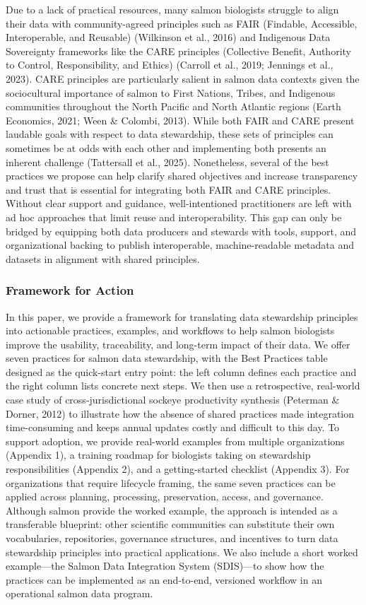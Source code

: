 \documentclass[
  letterpaper,
  DIV=11,
  numbers=noendperiod]{scrartcl}
\begin{document}
Due to a lack of practical resources, many salmon biologists struggle to
align their data with community-agreed principles such as FAIR
(Findable, Accessible, Interoperable, and Reusable) (Wilkinson et al.,
2016) and Indigenous Data Sovereignty frameworks like the CARE
principles (Collective Benefit, Authority to Control, Responsibility,
and Ethics) (Carroll et al., 2019; Jennings et al., 2023). CARE
principles are particularly salient in salmon data contexts given the
sociocultural importance of salmon to First Nations, Tribes, and
Indigenous communities throughout the North Pacific and North Atlantic
regions (Earth Economics, 2021; Ween \& Colombi, 2013). While both FAIR
and CARE present laudable goals with respect to data stewardship, these
sets of principles can sometimes be at odds with each other and
implementing both presents an inherent challenge (Tattersall et al.,
2025). Nonetheless, several of the best practices we propose can help
clarify shared objectives and increase transparency and trust that is
essential for integrating both FAIR and CARE principles. Without clear
support and guidance, well-intentioned practitioners are left with ad
hoc approaches that limit reuse and interoperability. This gap can only
be bridged by equipping both data producers and stewards with tools,
support, and organizational backing to publish interoperable,
machine-readable metadata and datasets in alignment with shared
principles.

\subsubsection{Framework for Action}\label{framework-for-action}

In this paper, we provide a framework for translating data stewardship
principles into actionable practices, examples, and workflows to help
salmon biologists improve the usability, traceability, and long-term
impact of their data. We offer seven practices for salmon data
stewardship, with the Best Practices table designed as the quick-start
entry point: the left column defines each practice and the right column
lists concrete next steps. We then use a retrospective, real-world case
study of cross-jurisdictional sockeye productivity synthesis (Peterman
\& Dorner, 2012) to illustrate how the absence of shared practices made
integration time-consuming and keeps annual updates costly and difficult
to this day. To support adoption, we provide real-world examples from
multiple organizations (Appendix 1), a training roadmap for biologists
taking on stewardship responsibilities (Appendix 2), and a
getting-started checklist (Appendix 3). For organizations that require
lifecycle framing, the same seven practices can be applied across
planning, processing, preservation, access, and governance. Although
salmon provide the worked example, the approach is intended as a
transferable blueprint: other scientific communities can substitute
their own vocabularies, repositories, governance structures, and
incentives to turn data stewardship principles into practical
applications. We also include a short worked example---the Salmon Data
Integration System (SDIS)---to show how the practices can be implemented
as an end-to-end, versioned workflow in an operational salmon data
program.
\end{document}
